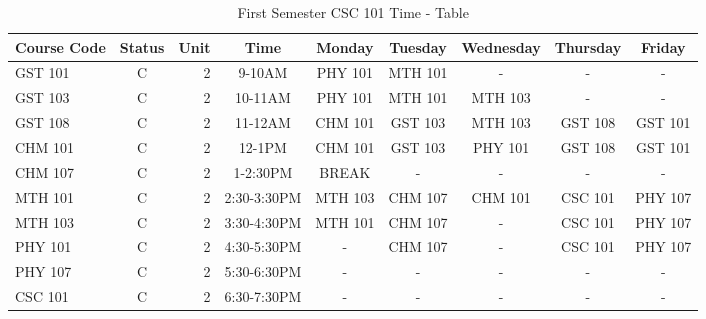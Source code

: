 \documentclass{article}
\begin{document}
	
 \begin{sidewaystable}[h!]
	\begin{center}
		\caption{First Semester CSC 101 Time - Table}
		\label{tab:table1}
		\begin{tabular}{|l|c|r|c|c|c|c|c|c|}
			\cellcolor{blue!25}\textbf{Course Code}& \cellcolor{blue!25}\textbf{Status}& \cellcolor{blue!25}\textbf{Unit}& \cellcolor{blue!25}\textbf{Time}&  \cellcolor{green!25}\textbf{Monday}&  \cellcolor{green!25}\textbf{Tuesday}& \cellcolor{green!25}\textbf{Wednesday}&  \cellcolor{green!25}\textbf{Thursday}&
			\cellcolor{green!25}\textbf{Friday}\\
			\hline
			\cellcolor{red!25}GST 101& C& 2& 9-10AM& PHY 101& MTH 101&-&-&- \\
			\cellcolor{red!25}GST 103&C&2&10-11AM&PHY 101& MTH 101&MTH 103&-&- \\
			\cellcolor{red!25}GST 108&C&2&11-12AM&CHM 101& GST 103& MTH 103& GST 108&GST 101 \\
			\cellcolor{red!25}CHM 101&C&2&12-1PM&CHM 101&GST 103&PHY 101&GST 108& GST 101\\
			\cellcolor{red!25}CHM 107&C&2&1-2:30PM&\cellcolor{black!10}BREAK& \cellcolor{black!10}-& \cellcolor{black!10}- & \cellcolor{black!10}- & \cellcolor{black!10}-\\
			\cellcolor{red!25}MTH 101&C&2&2:30-3:30PM&MTH 103&CHM 107&CHM 101& CSC 101&PHY 107\\
			\cellcolor{red!25}MTH 103&C&2&3:30-4:30PM&MTH 101&CHM 107&-&CSC 101& PHY 107 \\
			\cellcolor{red!25}PHY 101&C&2&4:30-5:30PM&-&CHM 107 &-& CSC 101 & PHY 107\\
		    \cellcolor{red!25}PHY 107&C&2&5:30-6:30PM&-&-&-&-&-\\
			\cellcolor{red!25}CSC 101&C&2&6:30-7:30PM&-&-&-&-&-\\
			\hline
		\end{tabular}
	\end{center}
 \end{sidewaystable}
\end{document}
